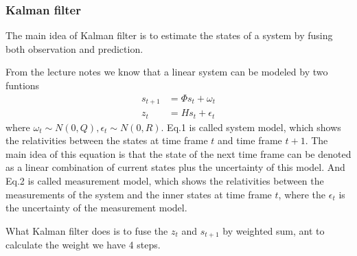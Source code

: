 \documentclass{article}
\begin{document}
\subsubsection*{Kalman filter}
\par 
The main idea of Kalman filter is to estimate the states of a system by fusing both observation and prediction.
\par
From the lecture notes we know that a linear system can be modeled by two funtions\cite{ref1}
\begin{align}
s_{t+1}&=\Phi s_t+\omega_t
\\z_t &=Hs_t+\epsilon_t
\end{align}
where $\omega_t \sim N(0,Q),\epsilon_t \sim N(0,R)$. Eq.1 is called system model, which shows the relativities between the states at time frame $t$ and time frame $t+1$. The main idea of this equation is that the state of the next time frame can be denoted as a linear combination of current states plus the uncertainty of this model. And Eq.2 is called measurement model, which shows the relativities between the measurements of the system and the inner states at time frame $t$, where the $\epsilon_t$ is the uncertainty of the measurement model. 
\par
What Kalman filter does is to fuse the $z_t$ and $s_{t+1}$ by weighted sum, ant to calculate the weight we have 4 steps.
\end{document}
